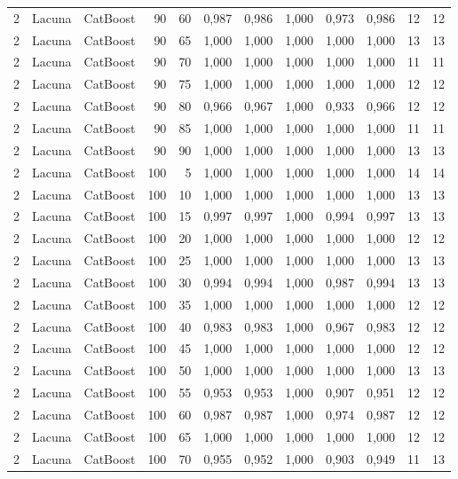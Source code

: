 \begin{longtable}{@{}rllrrrrrrrrr@{}}
2 & Lacuna & CatBoost & 90 & 60 & 0,987 & 0,986 & 1,000 & 0,973 & 0,986 & 12 & 12 \\
2 & Lacuna & CatBoost & 90 & 65 & 1,000 & 1,000 & 1,000 & 1,000 & 1,000 & 13 & 13 \\
2 & Lacuna & CatBoost & 90 & 70 & 1,000 & 1,000 & 1,000 & 1,000 & 1,000 & 11 & 11 \\
2 & Lacuna & CatBoost & 90 & 75 & 1,000 & 1,000 & 1,000 & 1,000 & 1,000 & 12 & 12 \\
2 & Lacuna & CatBoost & 90 & 80 & 0,966 & 0,967 & 1,000 & 0,933 & 0,966 & 12 & 12 \\
2 & Lacuna & CatBoost & 90 & 85 & 1,000 & 1,000 & 1,000 & 1,000 & 1,000 & 11 & 11 \\
2 & Lacuna & CatBoost & 90 & 90 & 1,000 & 1,000 & 1,000 & 1,000 & 1,000 & 13 & 13 \\
2 & Lacuna & CatBoost & 100 & 5 & 1,000 & 1,000 & 1,000 & 1,000 & 1,000 & 14 & 14 \\
2 & Lacuna & CatBoost & 100 & 10 & 1,000 & 1,000 & 1,000 & 1,000 & 1,000 & 13 & 13 \\
2 & Lacuna & CatBoost & 100 & 15 & 0,997 & 0,997 & 1,000 & 0,994 & 0,997 & 13 & 13 \\
2 & Lacuna & CatBoost & 100 & 20 & 1,000 & 1,000 & 1,000 & 1,000 & 1,000 & 12 & 12 \\
2 & Lacuna & CatBoost & 100 & 25 & 1,000 & 1,000 & 1,000 & 1,000 & 1,000 & 13 & 13 \\
2 & Lacuna & CatBoost & 100 & 30 & 0,994 & 0,994 & 1,000 & 0,987 & 0,994 & 13 & 13 \\
2 & Lacuna & CatBoost & 100 & 35 & 1,000 & 1,000 & 1,000 & 1,000 & 1,000 & 12 & 12 \\
2 & Lacuna & CatBoost & 100 & 40 & 0,983 & 0,983 & 1,000 & 0,967 & 0,983 & 12 & 12 \\
2 & Lacuna & CatBoost & 100 & 45 & 1,000 & 1,000 & 1,000 & 1,000 & 1,000 & 12 & 12 \\
2 & Lacuna & CatBoost & 100 & 50 & 1,000 & 1,000 & 1,000 & 1,000 & 1,000 & 13 & 13 \\
2 & Lacuna & CatBoost & 100 & 55 & 0,953 & 0,953 & 1,000 & 0,907 & 0,951 & 12 & 12 \\
2 & Lacuna & CatBoost & 100 & 60 & 0,987 & 0,987 & 1,000 & 0,974 & 0,987 & 12 & 12 \\
2 & Lacuna & CatBoost & 100 & 65 & 1,000 & 1,000 & 1,000 & 1,000 & 1,000 & 12 & 12 \\
2 & Lacuna & CatBoost & 100 & 70 & 0,955 & 0,952 & 1,000 & 0,903 & 0,949 & 11 & 13 \\

\end{longtable}
